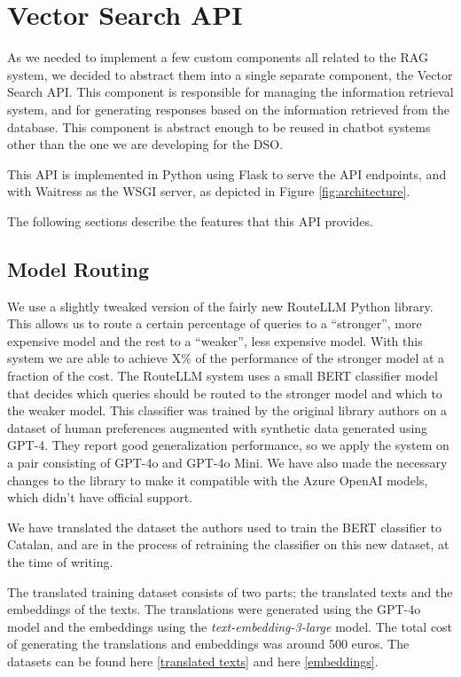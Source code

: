 \documentclass[a4paper,12pt,twoside]{ThesisStyle}
\begin{document}
\section{Vector Search API}
\label{sec:vector_search_api}

As we needed to implement a few custom components all related to the RAG system, we decided to abstract them into a single separate component, the Vector Search API. This component is responsible for managing the information retrieval system, and for generating responses based on the information retrieved from the database. This component is abstract enough to be reused in chatbot systems other than the one we are developing for the DSO.

This API is implemented in Python using Flask to serve the API endpoints, and with Waitress as the WSGI server, as depicted in Figure \ref{fig:architecture}.

The following sections describe the features that this API provides.

\subsection{Model Routing}
\label{subsec:model_routing}

We use a slightly tweaked version of the fairly new RouteLLM Python library. This allows us to route a certain percentage of queries to a ``stronger'', more expensive model and the rest to a ``weaker'', less expensive model. With this system we are able to achieve X\% of the performance of the stronger model at a fraction of the cost. The RouteLLM system uses a small BERT classifier model that decides which queries should be routed to the stronger model and which to the weaker model. This classifier was trained by the original library authors on a dataset of human preferences augmented with synthetic data generated using GPT-4. They report good generalization performance, so we apply the system on a pair consisting of GPT-4o and GPT-4o Mini. We have also made the necessary changes to the library to make it compatible with the Azure OpenAI models, which didn't have official support.

We have translated the dataset the authors used to train the BERT classifier to Catalan, and are in the process of retraining the classifier on this new dataset, at the time of writing.

The translated training dataset consists of two parts: the translated texts and the embeddings of the texts. The translations were generated using the GPT-4o model and the embeddings using the \textit{text-embedding-3-large} model. The total cost of generating the translations and embeddings was around 500 euros. The datasets can be found here \href{https://huggingface.co/datasets/SupremeLobster/gpt4_judge_battles_catalan}{[translated texts]} and here \href{https://huggingface.co/datasets/SupremeLobster/gpt4_judge_battles_catalan_embeddings}{[embeddings]}.
\end{document}

